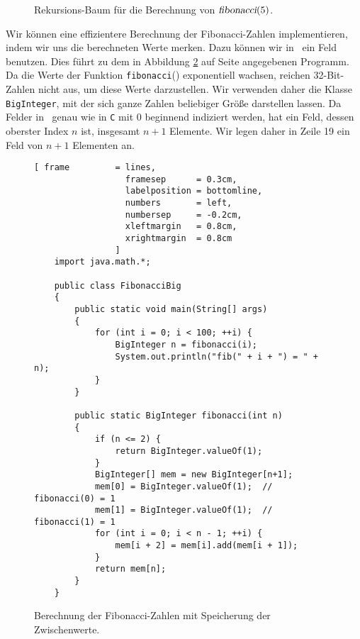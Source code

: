 \begin{figure}[!ht]
  \centering
  \caption{Rekursions-Baum f\"ur die Berechnung von $\textsl{fibonacci}(5)$.}
  \label{fig:fibonacci.eps}
\end{figure}


Wir k\"onnen eine effizientere Berechnung der Fibonacci-Zahlen implementieren, indem wir
uns die berechneten Werte merken.  Dazu k\"onnen wir in \Java\ ein Feld benutzen.
 Dies f\"uhrt zu dem in Abbildung \ref{fig:fibonacci-dynamic}
auf Seite \pageref{fig:fibonacci-dynamic} angegebenen Programm.
Da die Werte der Funktion \texttt{fibonacci}() exponentiell wachsen, reichen 32-Bit-Zahlen
nicht aus, um diese Werte darzustellen.  Wir verwenden daher die Klasse
\texttt{BigInteger}, mit der sich ganze Zahlen beliebiger Gr\"o{\ss}e darstellen lassen.
Da Felder in \Java\ genau wie in \texttt{C} mit 0 beginnend indiziert werden,
hat ein Feld, dessen oberster Index $n$ ist, insgesamt $n+1$ Elemente.  Wir legen daher in
Zeile 19 ein Feld von $n+1$ Elementen an.

\begin{figure}[!h]
  \centering
\begin{Verbatim}[ frame         = lines, 
                  framesep      = 0.3cm, 
                  labelposition = bottomline,
                  numbers       = left,
                  numbersep     = -0.2cm,
                  xleftmargin   = 0.8cm,
                  xrightmargin  = 0.8cm
                ]
    import java.math.*;
    
    public class FibonacciBig
    {
        public static void main(String[] args) 
        {
            for (int i = 0; i < 100; ++i) {
                BigInteger n = fibonacci(i);
                System.out.println("fib(" + i + ") = " + n);
            }
        }
        
        public static BigInteger fibonacci(int n) 
        {
            if (n <= 2) {
                return BigInteger.valueOf(1);
            }
            BigInteger[] mem = new BigInteger[n+1];
            mem[0] = BigInteger.valueOf(1);  // fibonacci(0) = 1
            mem[1] = BigInteger.valueOf(1);  // fibonacci(1) = 1
            for (int i = 0; i < n - 1; ++i) {
                mem[i + 2] = mem[i].add(mem[i + 1]);
            }
            return mem[n];
        }
    }
\end{Verbatim}
\vspace*{-0.3cm}
  \caption{Berechnung der Fibonacci-Zahlen mit Speicherung der Zwischenwerte.}
  \label{fig:fibonacci-dynamic}
\end{figure} 


